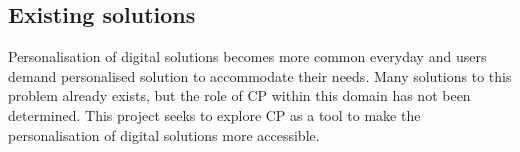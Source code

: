 \subsection{Existing solutions}
Personalisation of digital solutions becomes more common everyday and users demand personalised solution to accommodate their needs. Many solutions to this problem already exists, but the role of CP within this domain has not been determined. This project seeks to explore CP as a tool to make the personalisation of digital solutions more accessible.
%
%
%
%
%
%
%
%
